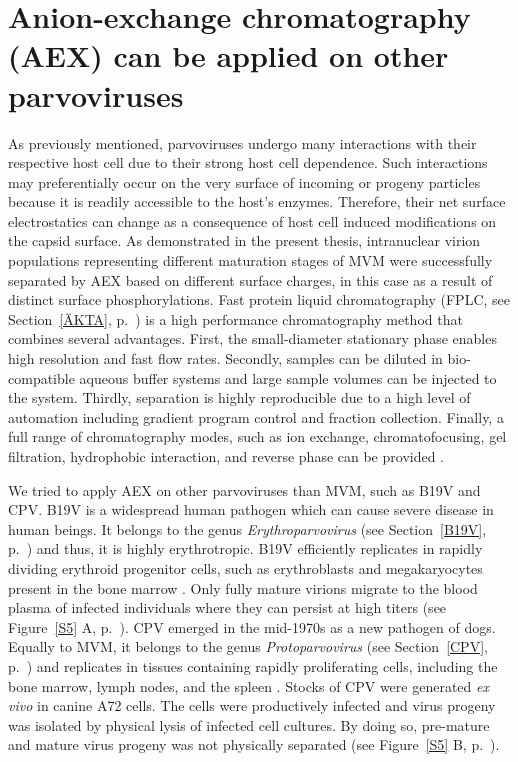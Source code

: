 \section{Anion-exchange chromatography (AEX) can be applied on other parvoviruses}

As previously mentioned, parvoviruses undergo many interactions with their respective host cell due to their strong host cell dependence. Such interactions may preferentially occur on the very surface of incoming or progeny particles because it is readily accessible to the host's enzymes. Therefore, their net surface electrostatics can change as a consequence of host cell induced modifications on the capsid surface. As demonstrated in the present thesis, intranuclear virion populations representing different maturation stages of MVM were successfully separated by AEX based on different surface charges, in this case as a result of distinct surface phosphorylations. Fast protein liquid chromatography (FPLC, see Section~\ref{ÄKTA}, p.~\pageref{ÄKTA}) is a high performance chromatography method that combines several advantages. First, the small-diameter stationary phase enables high resolution and fast flow rates. Secondly, samples can be diluted in bio-compatible aqueous buffer systems and large sample volumes can be injected to the system. Thirdly, separation is highly reproducible due to a high level of automation including gradient program control and fraction collection. Finally, a full range of chromatography modes, such as ion exchange, chromatofocusing, gel filtration, hydrophobic interaction, and reverse phase can be provided \cite{pmid20978981}. 

We tried to apply AEX on other parvoviruses than MVM, such as B19V and CPV. B19V is a widespread human pathogen which can cause severe disease in human beings. It belongs to the genus \textit{Erythroparvovirus} (see Section~\ref{B19V}, p.~\pageref{B19V}) and thus, it is highly erythrotropic. B19V efficiently replicates in rapidly dividing erythroid progenitor cells, such as erythroblasts and megakaryocytes present in the bone marrow \cite{pmid12097253}. Only fully mature virions migrate to the blood plasma of infected individuals where they can persist at high titers (see Figure~\ref{S5} A, p.~\pageref{S5}). CPV emerged in the mid-1970s as a new pathogen of dogs. Equally to MVM, it belongs to the genus \textit{Protoparvovirus} (see Section~\ref{CPV}, p.~\pageref{CPV}) and replicates in tissues containing rapidly proliferating cells, including the bone marrow, lymph nodes, and the spleen \cite{pmid20152105}. Stocks of CPV were generated \textit{ex vivo} in canine A72 cells. The cells were productively infected and virus progeny was isolated by physical lysis of infected cell cultures. By doing so, pre-mature and mature virus progeny was not physically separated (see Figure~\ref{S5} B, p.~\pageref{S5}). 

